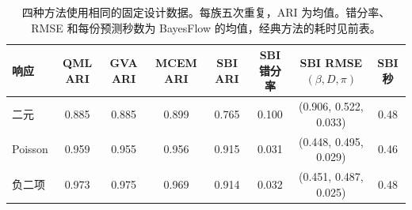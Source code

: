 \begin{table}[H]\centering\small\setlength{\tabcolsep}{4pt}
\caption{四种方法使用相同的固定设计数据。每族五次重复，ARI 为均值。错分率、RMSE 和每份预测秒数为 BayesFlow 的均值，经典方法的耗时见前表。}
\begin{tabular}{lccccccc}\toprule
响应 & QML ARI & GVA ARI & MCEM ARI & SBI ARI & SBI 错分率 & SBI RMSE $(\beta,D,\pi)$ & SBI 秒 \\\midrule
二元 & 0.885 & 0.885 & 0.899 & 0.765 & 0.100 & (0.906, 0.522, 0.033) & 0.48 \\
Poisson & 0.959 & 0.955 & 0.956 & 0.915 & 0.031 & (0.448, 0.495, 0.029) & 0.46 \\
负二项 & 0.973 & 0.975 & 0.969 & 0.914 & 0.032 & (0.451, 0.487, 0.025) & 0.48 \\
\bottomrule\end{tabular}\end{table}
